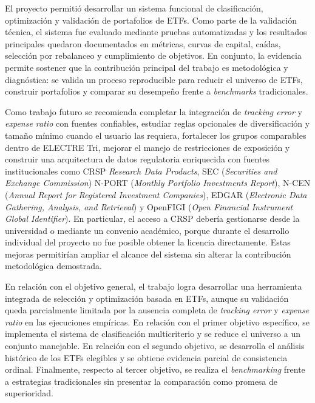 \documentclass[12pt,letterpaper]{article}
\begin{document}
El proyecto permitió desarrollar un sistema funcional de clasificación, optimización y validación de portafolios de ETFs. Como parte de la validación técnica, el sistema fue evaluado mediante pruebas automatizadas y los resultados principales quedaron documentados en métricas, curvas de capital, caídas, selección por rebalanceo y cumplimiento de objetivos. En conjunto, la evidencia permite sostener que la contribución principal del trabajo es metodológica y diagnóstica: se valida un proceso reproducible para reducir el universo de ETFs, construir portafolios y comparar su desempeño frente a \textit{benchmarks} tradicionales.

Como trabajo futuro se recomienda completar la integración de \textit{tracking error} y \textit{expense ratio} con fuentes confiables, estudiar reglas opcionales de diversificación y tamaño mínimo cuando el usuario las requiera, fortalecer los grupos comparables dentro de ELECTRE Tri, mejorar el manejo de restricciones de exposición y construir una arquitectura de datos regulatoria enriquecida con fuentes institucionales como CRSP \textit{Research Data Products}, SEC (\textit{Securities and Exchange Commission}) N-PORT (\textit{Monthly Portfolio Investments Report}), N-CEN (\textit{Annual Report for Registered Investment Companies}), EDGAR (\textit{Electronic Data Gathering, Analysis, and Retrieval}) y OpenFIGI (\textit{Open Financial Instrument Global Identifier}). En particular, el acceso a CRSP debería gestionarse desde la universidad o mediante un convenio académico, porque durante el desarrollo individual del proyecto no fue posible obtener la licencia directamente. Estas mejoras permitirían ampliar el alcance del sistema sin alterar la contribución metodológica demostrada.

En relación con el objetivo general, el trabajo logra desarrollar una herramienta integrada de selección y optimización basada en ETFs, aunque su validación queda parcialmente limitada por la ausencia completa de \textit{tracking error} y \textit{expense ratio} en las ejecuciones empíricas. En relación con el primer objetivo específico, se implementa el sistema de clasificación multicriterio y se reduce el universo a un conjunto manejable. En relación con el segundo objetivo, se desarrolla el análisis histórico de los ETFs elegibles y se obtiene evidencia parcial de consistencia ordinal. Finalmente, respecto al tercer objetivo, se realiza el \textit{benchmarking} frente a estrategias tradicionales sin presentar la comparación como promesa de superioridad.
\end{document}
